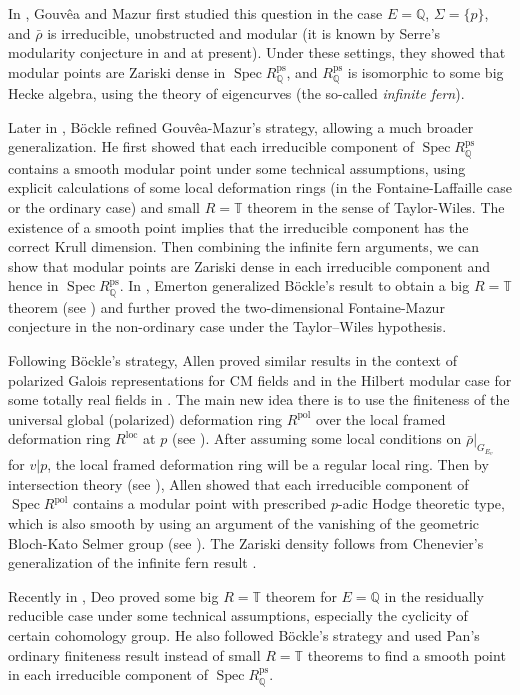 \documentclass[a4paper, 12pt]{amsart}
\DeclareMathOperator{\Spec}{Spec}
\def\ps{\mathrm{ps}}
\newcommand{\Q}{\mathbb{Q}}
\newcommand{\T}{\mathbb{T}}
\begin{document}
	 In \cite{gouvea}, Gouv\^ea and Mazur first studied this question in the case $E=\Q$, $\Sigma = \{p\}$, and $\bar{\rho}$ is irreducible, unobstructed and modular (it is known by Serre's modularity conjecture in \cite{Khare_2009a} and \cite{Khare_2009} at present). Under these settings, they showed that modular points are Zariski dense in $\Spec R_\Q^\ps$, and $ R_\Q^\ps$ is isomorphic to some big Hecke algebra, using the theory of eigencurves (the so-called \textit{infinite fern}).
	
		Later in \cite{B_ckle_2001}, B\"ockle refined Gouv\^ea-Mazur's strategy, allowing a much broader generalization. He first showed that each irreducible component of $\Spec R_\Q^\ps$ contains a smooth modular point under some technical assumptions, using explicit calculations of some local deformation rings (in the Fontaine-Laffaille case or the ordinary case) and small $R=\T$ theorem in the sense of Taylor-Wiles. The existence of a smooth point implies that the irreducible component has the correct Krull dimension. Then combining the infinite fern arguments, we can show that modular points are Zariski dense in each irreducible component and hence in $\Spec R_\Q^\ps$. In \cite{emerton11}, Emerton generalized B\"ockle's result to obtain a big $R=\T$ theorem (see \cite[Theorem 1.2.3]{emerton11}) and further proved the two-dimensional Fontaine-Mazur conjecture in the non-ordinary case under the Taylor--Wiles hypothesis.
	
	 Following B\"ockle's strategy, Allen proved similar results in the context of polarized Galois representations for CM fields and in the Hilbert modular case for some totally real fields in \cite{Allen_2019}. The main new idea there is to use the finiteness of the universal global (polarized) deformation ring $R^{\operatorname{pol}}$ over the local framed deformation ring $R^{\operatorname{loc}}$ at $p$ (see \cite{Allen_2014}). After assuming some local conditions on $\bar{\rho}|_{G_{E_v}}$ for $v|p$, the local framed deformation ring will be a regular local ring. Then by intersection theory (see \cite[Lemma 1.1.2]{Allen_2019}), Allen showed that each irreducible component of $ \Spec R^{\operatorname{pol}}$ contains a modular point with prescribed $p$-adic Hodge theoretic type, which is also smooth by using an argument of the vanishing of the geometric Bloch-Kato Selmer group (see \cite{Allen_2016}). The Zariski density follows from Chenevier's generalization of the infinite fern result \cite{chenevier2011}.
	
	Recently in \cite{Deo2023}, Deo proved some big $R=\T$ theorem for $E=\Q$ in the residually reducible case under some technical assumptions, especially the cyclicity of certain cohomology group. He also followed B\"ockle's strategy and used Pan's ordinary finiteness result \cite[Theorem 5.1.1]{pan2022fontaine} instead of small $R=\T$ theorems to find a smooth point in each irreducible component of $\Spec R_\Q^\ps$. 
	
\end{document}
